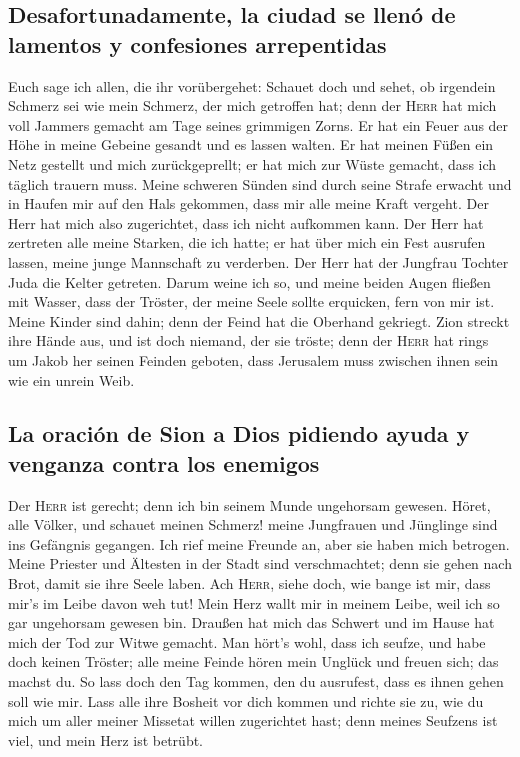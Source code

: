 \hypertarget{desafortunadamente-la-ciudad-se-llenuxf3-de-lamentos-y-confesiones-arrepentidas}{%
\subsection{Desafortunadamente, la ciudad se llenó de lamentos y
confesiones
arrepentidas}\label{desafortunadamente-la-ciudad-se-llenuxf3-de-lamentos-y-confesiones-arrepentidas}}

 Euch sage ich allen, die ihr vorübergehet: Schauet doch
und sehet, ob irgendein Schmerz sei wie mein Schmerz, der mich getroffen
hat; denn der \textsc{Herr} hat mich voll Jammers gemacht am Tage seines
grimmigen Zorns.  Er hat ein Feuer aus der Höhe in meine
Gebeine gesandt und es lassen walten. Er hat meinen Füßen ein Netz
gestellt und mich zurückgeprellt; er hat mich zur Wüste gemacht, dass
ich täglich trauern muss.  Meine schweren Sünden sind
durch seine Strafe erwacht und in Haufen mir auf den Hals gekommen, dass
mir alle meine Kraft vergeht. Der Herr hat mich also zugerichtet, dass
ich nicht aufkommen kann.  Der Herr hat zertreten alle
meine Starken, die ich hatte; er hat über mich ein Fest ausrufen lassen,
meine junge Mannschaft zu verderben. Der Herr hat der Jungfrau Tochter
Juda die Kelter getreten.  Darum weine ich so, und meine
beiden Augen fließen mit Wasser, dass der Tröster, der meine Seele
sollte erquicken, fern von mir ist. Meine Kinder sind dahin; denn der
Feind hat die Oberhand gekriegt.  Zion streckt ihre Hände
aus, und ist doch niemand, der sie tröste; denn der \textsc{Herr} hat
rings um Jakob her seinen Feinden geboten, dass Jerusalem muss zwischen
ihnen sein wie ein unrein Weib.

\hypertarget{la-oraciuxf3n-de-sion-a-dios-pidiendo-ayuda-y-venganza-contra-los-enemigos}{%
\subsection{La oración de Sion a Dios pidiendo ayuda y venganza contra
los
enemigos}\label{la-oraciuxf3n-de-sion-a-dios-pidiendo-ayuda-y-venganza-contra-los-enemigos}}

 Der \textsc{Herr} ist gerecht; denn ich bin seinem Munde
ungehorsam gewesen. Höret, alle Völker, und schauet meinen Schmerz!
meine Jungfrauen und Jünglinge sind ins Gefängnis gegangen.
 Ich rief meine Freunde an, aber sie haben mich betrogen.
Meine Priester und Ältesten in der Stadt sind verschmachtet; denn sie
gehen nach Brot, damit sie ihre Seele laben.  Ach
\textsc{Herr}, siehe doch, wie bange ist mir, dass mir's im Leibe davon
weh tut! Mein Herz wallt mir in meinem Leibe, weil ich so gar ungehorsam
gewesen bin. Draußen hat mich das Schwert und im Hause hat mich der Tod
zur Witwe gemacht.  Man hört's wohl, dass ich seufze, und
habe doch keinen Tröster; alle meine Feinde hören mein Unglück und
freuen sich; das machst du. So lass doch den Tag kommen, den du
ausrufest, dass es ihnen gehen soll wie mir.  Lass alle
ihre Bosheit vor dich kommen und richte sie zu, wie du mich um aller
meiner Missetat willen zugerichtet hast; denn meines Seufzens ist viel,
und mein Herz ist betrübt.

